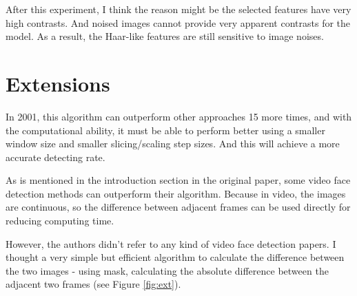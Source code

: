 \documentclass[10pt,twocolumn,letterpaper]{article}
\begin{document}
After this experiment, I think the reason might be the selected features have very high contrasts.
And noised images cannot provide very apparent contrasts for the model.
As a result, the Haar-like features are still sensitive to image noises.


\section{Extensions}
In 2001, this algorithm can outperform other approaches 15 more times, and with the computational ability,
it must be able to perform better using a smaller window size and smaller slicing/scaling step sizes.
And this will achieve a more accurate detecting rate.

As is mentioned in the introduction section in the original paper, some video face detection methods can outperform their algorithm.
Because in video, the images are continuous, so the difference between adjacent frames can be used directly for reducing computing time.

However, the authors didn't refer to any kind of video face detection papers.
I thought a very simple but efficient algorithm to calculate the difference between the two images - using mask,
calculating the absolute difference between the adjacent two frames (see Figure \ref{fig:ext}).
\end{document}
